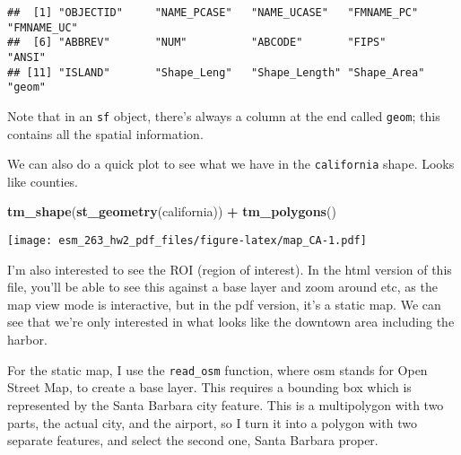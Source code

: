 \documentclass[
]{article}
\newenvironment{Shaded}{\begin{snugshade}}{\end{snugshade}}
\newcommand{\KeywordTok}[1]{\textcolor[rgb]{0.13,0.29,0.53}{\textbf{#1}}}
\newcommand{\NormalTok}[1]{#1}
\newcommand{\OperatorTok}[1]{\textcolor[rgb]{0.81,0.36,0.00}{\textbf{#1}}}
\newcommand{\StringTok}[1]{\textcolor[rgb]{0.31,0.60,0.02}{#1}}
\begin{document}
\begin{verbatim}
##  [1] "OBJECTID"     "NAME_PCASE"   "NAME_UCASE"   "FMNAME_PC"    "FMNAME_UC"   
##  [6] "ABBREV"       "NUM"          "ABCODE"       "FIPS"         "ANSI"        
## [11] "ISLAND"       "Shape_Leng"   "Shape_Length" "Shape_Area"   "geom"
\end{verbatim}

Note that in an \texttt{sf} object, there's always a column at the end
called \texttt{geom}; this contains all the spatial information.

We can also do a quick plot to see what we have in the
\texttt{california} shape. Looks like counties.

\begin{Shaded}
\begin{Highlighting}[]
\KeywordTok{tm_shape}\NormalTok{(}\KeywordTok{st_geometry}\NormalTok{(california)) }\OperatorTok{+}
\StringTok{  }\KeywordTok{tm_polygons}\NormalTok{()}
\end{Highlighting}
\end{Shaded}

\texttt{[image: esm\_263\_hw2\_pdf\_files/figure-latex/map\_CA-1.pdf]}

I'm also interested to see the ROI (region of interest). In the html
version of this file, you'll be able to see this against a base layer
and zoom around etc, as the map view mode is interactive, but in the pdf
version, it's a static map. We can see that we're only interested in
what looks like the downtown area including the harbor.

For the static map, I use the \texttt{read\_osm} function, where osm
stands for Open Street Map, to create a base layer. This requires a
bounding box which is represented by the Santa Barbara city feature.
This is a multipolygon with two parts, the actual city, and the airport,
so I turn it into a polygon with two separate features, and select the
second one, Santa Barbara proper.
\end{document}
